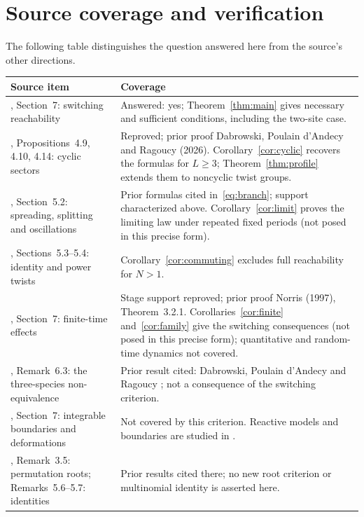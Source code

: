 \documentclass[11pt]{article}
\theoremstyle{remark}
\begin{document}
\section{Source coverage and verification}
The following table distinguishes the question answered here from the source's
other directions.
\begin{center}\small
\begin{tabular}{@{}p{}p{}@{}}\toprule
Source item & Coverage \\\midrule
\cite{DPR}, Section~7: switching reachability &
Answered: yes; Theorem~\ref{thm:main} gives necessary and sufficient
conditions, including the two-site case.\\[3pt]
\cite{DPR}, Propositions~4.9, 4.10, 4.14: cyclic sectors &
Reproved; prior proof Dabrowski, Poulain d'Andecy and Ragoucy (2026).
Corollary~\ref{cor:cyclic} recovers the formulas for $L\geq3$;
Theorem~\ref{thm:profile} extends them to noncyclic twist groups.\\[3pt]
\cite{DPR}, Section~5.2: spreading, splitting and oscillations &
Prior formulas cited in~\eqref{eq:branch}; support characterized above.
Corollary~\ref{cor:limit} proves the limiting law under repeated fixed periods
(not posed in this precise form).\\[3pt]
\cite{DPR}, Sections~5.3--5.4: identity and power twists &
Corollary~\ref{cor:commuting} excludes full reachability for $N>1$.\\[3pt]
\cite{DPR}, Section~7: finite-time effects &
Stage support reproved; prior proof Norris (1997), Theorem~3.2.1.
Corollaries~\ref{cor:finite} and~\ref{cor:family} give the switching
consequences (not posed in this precise form); quantitative and
random-time dynamics not covered.\\[3pt]
\cite{DPR}, Remark~6.3: the three-species non-equivalence &
Prior result cited: Dabrowski, Poulain d'Andecy and Ragoucy
\cite[Remark~A.8: v1, p.~30, 21 July 2026; v2, p.~31]{DPRreactive};
not a consequence of the switching criterion.\\[3pt]
\cite{DPR}, Section~7: integrable boundaries and deformations &
Not covered by this criterion. Reactive models and boundaries are studied in
\cite{DPRreactive}.\\[3pt]
\cite{DPR}, Remark~3.5: permutation roots; Remarks~5.6--5.7: identities &
Prior results cited there; no new root criterion or multinomial identity
is asserted here.\\\bottomrule
\end{tabular}
\end{center}
\end{document}
